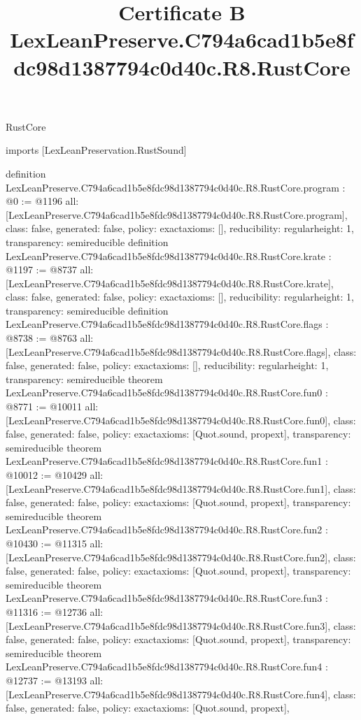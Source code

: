 \begin{lexlean}{RustCore}
\title{Certificate B LexLeanPreserve.C794a6cad1b5e8fdc98d1387794c0d40c.R8.RustCore}
\begin{coremodule}
imports [LexLeanPreservation.RustSound]

definition LexLeanPreserve.C794a6cad1b5e8fdc98d1387794c0d40c.R8.RustCore.program : @0 := @1196 {
  all: [LexLeanPreserve.C794a6cad1b5e8fdc98d1387794c0d40c.R8.RustCore.program],
  class: false,
  generated: false,
  policy: exact{axioms: []},
  reducibility: regular{height: 1},
  transparency: semireducible
}
definition LexLeanPreserve.C794a6cad1b5e8fdc98d1387794c0d40c.R8.RustCore.krate : @1197 := @8737 {
  all: [LexLeanPreserve.C794a6cad1b5e8fdc98d1387794c0d40c.R8.RustCore.krate],
  class: false,
  generated: false,
  policy: exact{axioms: []},
  reducibility: regular{height: 1},
  transparency: semireducible
}
definition LexLeanPreserve.C794a6cad1b5e8fdc98d1387794c0d40c.R8.RustCore.flags : @8738 := @8763 {
  all: [LexLeanPreserve.C794a6cad1b5e8fdc98d1387794c0d40c.R8.RustCore.flags],
  class: false,
  generated: false,
  policy: exact{axioms: []},
  reducibility: regular{height: 1},
  transparency: semireducible
}
theorem LexLeanPreserve.C794a6cad1b5e8fdc98d1387794c0d40c.R8.RustCore.fun0 : @8771 := @10011 {
  all: [LexLeanPreserve.C794a6cad1b5e8fdc98d1387794c0d40c.R8.RustCore.fun0],
  class: false,
  generated: false,
  policy: exact{axioms: [Quot.sound, propext]},
  transparency: semireducible
}
theorem LexLeanPreserve.C794a6cad1b5e8fdc98d1387794c0d40c.R8.RustCore.fun1 : @10012 := @10429 {
  all: [LexLeanPreserve.C794a6cad1b5e8fdc98d1387794c0d40c.R8.RustCore.fun1],
  class: false,
  generated: false,
  policy: exact{axioms: [Quot.sound, propext]},
  transparency: semireducible
}
theorem LexLeanPreserve.C794a6cad1b5e8fdc98d1387794c0d40c.R8.RustCore.fun2 : @10430 := @11315 {
  all: [LexLeanPreserve.C794a6cad1b5e8fdc98d1387794c0d40c.R8.RustCore.fun2],
  class: false,
  generated: false,
  policy: exact{axioms: [Quot.sound, propext]},
  transparency: semireducible
}
theorem LexLeanPreserve.C794a6cad1b5e8fdc98d1387794c0d40c.R8.RustCore.fun3 : @11316 := @12736 {
  all: [LexLeanPreserve.C794a6cad1b5e8fdc98d1387794c0d40c.R8.RustCore.fun3],
  class: false,
  generated: false,
  policy: exact{axioms: [Quot.sound, propext]},
  transparency: semireducible
}
theorem LexLeanPreserve.C794a6cad1b5e8fdc98d1387794c0d40c.R8.RustCore.fun4 : @12737 := @13193 {
  all: [LexLeanPreserve.C794a6cad1b5e8fdc98d1387794c0d40c.R8.RustCore.fun4],
  class: false,
  generated: false,
  policy: exact{axioms: [Quot.sound, propext]},
}
\end{coremodule}
\end{lexlean}

